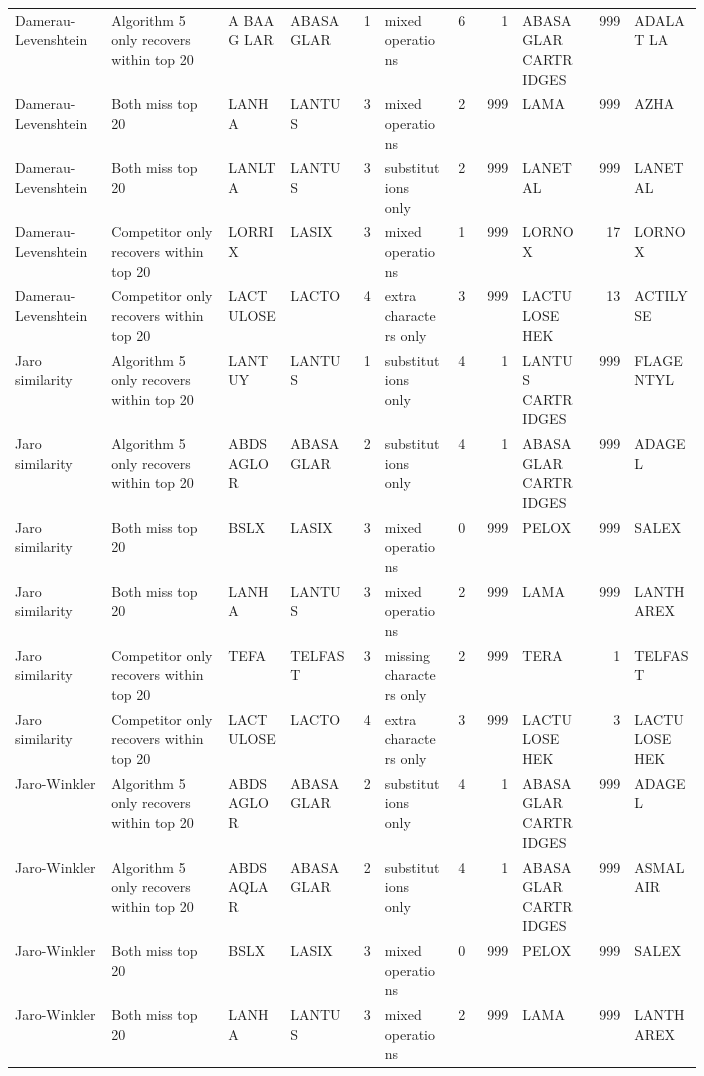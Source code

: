 \begin{landscape}
\begin{tiny}
\begin{longtable}{@{}L{0.14\linewidth}L{0.17\linewidth}L{0.09\linewidth}L{0.10\linewidth}rL{0.10\linewidth}rrL{0.10\linewidth}rL{0.10\linewidth}@{}}
Damerau-Levenshtein & Algorithm 5 only recovers within top 20 & A BAA G LAR & ABASAGLAR & 1 & mixed operations & 6 & 1 & ABASAGLAR CARTRIDGES & 999 & ADALAT LA \\
Damerau-Levenshtein & Both miss top 20 & LANHA & LANTUS & 3 & mixed operations & 2 & 999 & LAMA & 999 & AZHA \\
Damerau-Levenshtein & Both miss top 20 & LANLTA & LANTUS & 3 & substitutions only & 2 & 999 & LANETAL & 999 & LANETAL \\
Damerau-Levenshtein & Competitor only recovers within top 20 & LORRIX & LASIX & 3 & mixed operations & 1 & 999 & LORNOX & 17 & LORNOX \\
Damerau-Levenshtein & Competitor only recovers within top 20 & LACTULOSE & LACTO & 4 & extra characters only & 3 & 999 & LACTULOSE HEK & 13 & ACTILYSE \\
Jaro similarity & Algorithm 5 only recovers within top 20 & LANTUY & LANTUS & 1 & substitutions only & 4 & 1 & LANTUS CARTRIDGES & 999 & FLAGENTYL \\
Jaro similarity & Algorithm 5 only recovers within top 20 & ABDSAGLOR & ABASAGLAR & 2 & substitutions only & 4 & 1 & ABASAGLAR CARTRIDGES & 999 & ADAGEL \\
Jaro similarity & Both miss top 20 & BSLX & LASIX & 3 & mixed operations & 0 & 999 & PELOX & 999 & SALEX \\
Jaro similarity & Both miss top 20 & LANHA & LANTUS & 3 & mixed operations & 2 & 999 & LAMA & 999 & LANTHAREX \\
Jaro similarity & Competitor only recovers within top 20 & TEFA & TELFAST & 3 & missing characters only & 2 & 999 & TERA & 1 & TELFAST \\
Jaro similarity & Competitor only recovers within top 20 & LACTULOSE & LACTO & 4 & extra characters only & 3 & 999 & LACTULOSE HEK & 3 & LACTULOSE HEK \\
Jaro-Winkler & Algorithm 5 only recovers within top 20 & ABDSAGLOR & ABASAGLAR & 2 & substitutions only & 4 & 1 & ABASAGLAR CARTRIDGES & 999 & ADAGEL \\
Jaro-Winkler & Algorithm 5 only recovers within top 20 & ABDSAQLAR & ABASAGLAR & 2 & substitutions only & 4 & 1 & ABASAGLAR CARTRIDGES & 999 & ASMALAIR \\
Jaro-Winkler & Both miss top 20 & BSLX & LASIX & 3 & mixed operations & 0 & 999 & PELOX & 999 & SALEX \\
Jaro-Winkler & Both miss top 20 & LANHA & LANTUS & 3 & mixed operations & 2 & 999 & LAMA & 999 & LANTHAREX \\

\end{longtable}
\end{tiny}
\end{landscape}
